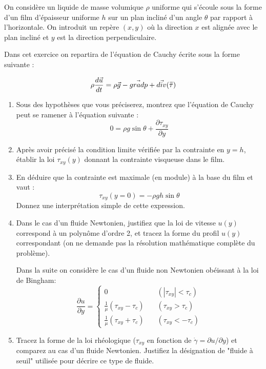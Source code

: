 On consid\`ere un liquide de masse volumique $\rho$ uniforme qui s'écoule 
sous la forme d'un film d'\'epaisseur uniforme $h$ sur un plan inclin\'e 
d'un angle $\theta$ par rapport \`a l'horizontale. On introduit un repère $(x,y)$ où la direction 
$x$ est alignée avec le plan incliné et $y$ est la direction perpendiculaire.


Dans cet exercice on repartira de l'équation de Cauchy écrite sous la forme suivante :

$$
\rho \frac{ d \vec{u}}{d t}  =  \rho \vec{ g} - \vec{grad} p + \vec{div} ( \accentset{=}{\tau} )
$$

\begin{enumerate}
\item 
Sous des hypothèses que vous préciserez, montrez que l'équation de Cauchy peut
se ramener à l'équation suivante :
$$ 
 0 =  \rho g \sin \theta + \frac{\partial \tau_{xy} }{\partial y}
$$

\item 
Après avoir précisé la condition limite vérifiée par la contrainte en $y=h$,  établir la loi 
$\tau_{xy}(y)$ donnant la contrainte visqueuse dans le film. 

\item 
En déduire que la contrainte est maximale (en module) à la base du film et vaut :
$$ 
\tau_{xy}(y=0)  = - \rho g h \sin \theta 
$$ 
Donnez une interprétation simple de cette expression.

\item Dans le cas d'un fluide Newtonien, justifiez que la loi de vitesse $u(y)$ 
correspond à un polynôme d'ordre 2, et tracez la forme du profil $u(y)$ correspondant
(on ne demande pas la résolution mathématique complète du problème).

Dans la suite on considère le cas d'un fluide non Newtonien obéissant à la loi de Bingham:
$$
\frac{\partial u}{\partial y }  = 
\left\{ \begin{array}{ll}  0 & \quad (|\tau_{xy}| < \tau_c) \\  
\frac{1}{\mu} (\tau_{xy}-\tau_c) & \quad ( \tau_{xy} > \tau_c) \\
\frac{1}{\mu} (\tau_{xy}+\tau_c) & \quad ( \tau_{xy} < -\tau_c) 
\end{array}
\right.
$$ 

\item  Tracez la forme de la loi rhéologique ($\tau_{xy}$ en fonction de 
$\dot{\gamma} = \partial u/\partial y $) et comparez au cas d'un fluide Newtonien. Justifiez la désignation de "fluide à seuil" utilisée pour décrire ce type de fluide.


\end{enumerate}
